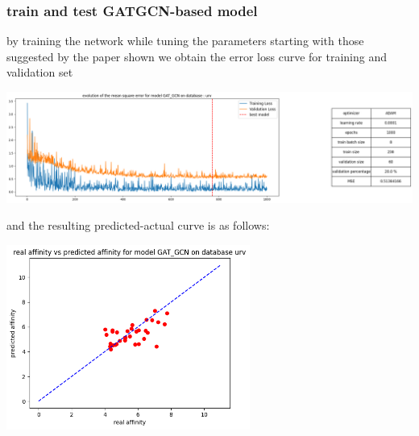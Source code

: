 \documentclass[11pt, a4paper]{article}
\begin{document}
        \subsubsection{train and test GATGCN-based model}
        by training the network while tuning the parameters starting with those suggested by the paper shown we obtain the error loss curve for training and validation set 
        \begin{center}
            \includegraphics[width=1.0\textwidth]{train_test_plots/URV GATGCN train.png}
        \end{center}
        and the resulting predicted-actual curve is as follows:
        \begin{center}
            \includegraphics[width=0.6\textwidth]{train_test_plots/URV GATGCN test.png}
        \end{center}
\end{document}
